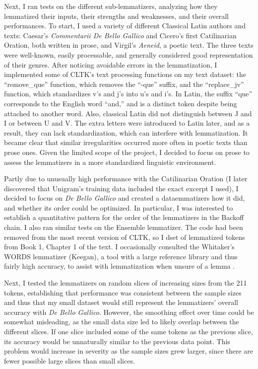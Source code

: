 \documentclass[11pt]{article}
\begin{document}
Next, I ran tests on the different sub-lemmatizers, analyzing how they lemmatized their inputs, their strengths and weaknesses, and their overall performances. To start, I used a variety of different Classical Latin authors and texts: Caesar’s \textit{Commentarii De Bello Gallico} and Cicero’s first Catilinarian Oration, both written in prose, and Virgil’s \textit{Aeneid}, a poetic text. The three texts were well-known, easily processable, and generally considered good representation of their genres. After noticing avoidable errors in the lemmatization, I implemented some of CLTK’s text processing functions on my text dataset: the “remove\_que” function, which removes the “-que” suffix, and the “replace\_jv” function, which standardizes v’s and j’s into u’s and i’s. In Latin, the suffix “que” corresponds to the English word “and,” and is a distinct token despite being attached to another word. Also, classical Latin did not distinguish between J and I or between U and V. The extra letters were introduced to Latin later, and as a result, they can lack standardization, which can interfere with lemmatization. It became clear that similar irregularities occurred more often in poetic texts than prose ones. Given the limited scope of the project, I decided to focus on prose to assess the lemmatizers in a more standardized linguistic environment.

Partly due to unusually high performance with the Catilinarian Oration (I later discovered that Unigram's training data included the exact excerpt I used), I decided to focus on \textit{De Bello Gallico} and created a dataemmatizers how it did, and whether its order could be optimized. In
particular, I was interested to establish a quantitative pattern for the order of the lemmatizers in
the Backoff chain.
I also ran similar tests on the Ensemble lemmatizer. The code had been removed from the most
recent version of CLTK, so I dset of lemmatized tokens from Book 1, Chapter 1 of the text. I occasionally consulted the Whitaker’s WORDS lemmatizer (Keegan), a tool with a large reference library and thus fairly high accuracy, to assist with lemmatization when unsure of a lemma \cite{whitakers-words}.

Next, I tested the lemmatizers on random slices of increasing sizes from the 211 tokens, establishing that performance was consistent between the sample sizes and thus that my small dataset would still represent the lemmatizers’ overall accuracy with \textit{De Bello Gallico}. However, the smoothing effect over time could be somewhat misleading, as the small data size led to likely overlap between the different slices. If one slice included some of the same tokens as the previous slice, its accuracy would be unnaturally similar to the previous data point. This problem would increase in severity as the sample sizes grew larger, since there are fewer possible large slices than small slices.
\end{document}
